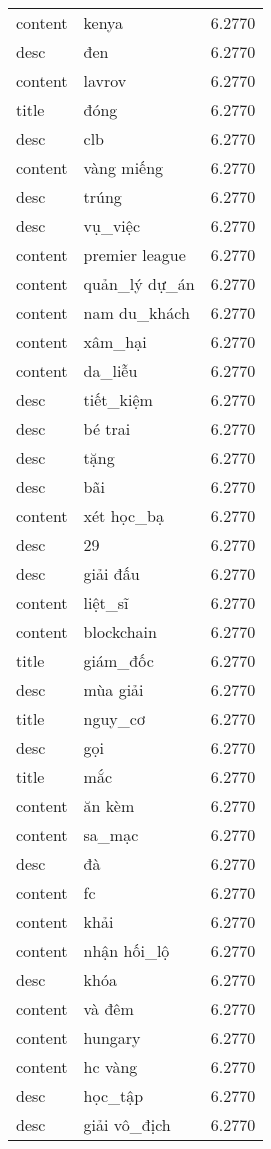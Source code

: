 \documentclass{article}
\begin{document}
\begin{tabular}{lll}
content & kenya & 6.2770\\
desc & đen & 6.2770\\
content & lavrov & 6.2770\\
title & đóng & 6.2770\\
desc & clb & 6.2770\\
content & vàng miếng & 6.2770\\
desc & trúng & 6.2770\\
desc & vụ\_việc & 6.2770\\
content & premier league & 6.2770\\
content & quản\_lý dự\_án & 6.2770\\
content & nam du\_khách & 6.2770\\
content & xâm\_hại & 6.2770\\
content & da\_liễu & 6.2770\\
desc & tiết\_kiệm & 6.2770\\
desc & bé trai & 6.2770\\
desc & tặng & 6.2770\\
desc & bãi & 6.2770\\
content & xét học\_bạ & 6.2770\\
desc & 29 & 6.2770\\
desc & giải đấu & 6.2770\\
content & liệt\_sĩ & 6.2770\\
content & blockchain & 6.2770\\
title & giám\_đốc & 6.2770\\
desc & mùa giải & 6.2770\\
title & nguy\_cơ & 6.2770\\
desc & gọi & 6.2770\\
title & mắc & 6.2770\\
content & ăn kèm & 6.2770\\
content & sa\_mạc & 6.2770\\
desc & đà & 6.2770\\
content & fc & 6.2770\\
content & khải & 6.2770\\
content & nhận hối\_lộ & 6.2770\\
desc & khóa & 6.2770\\
content & và đêm & 6.2770\\
content & hungary & 6.2770\\
content & hc vàng & 6.2770\\
desc & học\_tập & 6.2770\\
desc & giải vô\_địch & 6.2770\\

\end{tabular}
\end{document}
